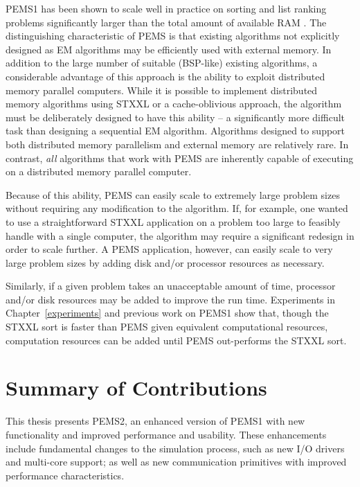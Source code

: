 \documentclass[12pt]{carletoncsthesis}
\begin{document}
PEMS1 has been shown to scale well in practice on sorting and list
ranking problems significantly larger than the total amount of available
RAM \cite{experimentswith}.  The distinguishing characteristic of PEMS is
that existing algorithms not explicitly designed as EM algorithms may be
efficiently used with external memory.  In addition to the large number of
suitable (BSP-like) existing algorithms, a considerable advantage of this
approach is the ability to exploit distributed memory parallel computers.
While it is possible to implement distributed memory algorithms using STXXL
or a cache-oblivious approach, the algorithm must be deliberately designed
to have this ability -- a significantly more difficult task than designing
a sequential EM algorithm.  Algorithms designed to support both distributed
memory parallelism and external memory are relatively rare.  In contrast,
{\em all} algorithms that work with PEMS are inherently capable of executing
on a distributed memory parallel computer.

Because of this ability, PEMS can easily scale to extremely large problem
sizes without requiring any modification to the algorithm.  If, for example,
one wanted to use a straightforward STXXL application on a problem too
large to feasibly handle with a single computer, the algorithm may require
a significant redesign in order to scale further.  A PEMS application,
however, can easily scale to very large problem sizes by adding disk and/or
processor resources as necessary.

Similarly, if a given problem takes an unacceptable amount of time, processor
and/or disk resources may be added to improve the run time.  Experiments in
Chapter~\ref{experiments} and previous work on PEMS1 \cite{mnthesis} show that,
though the STXXL sort is faster than PEMS given equivalent computational
resources, computation resources can be added until PEMS out-performs the
STXXL sort.

\section{Summary of Contributions}
\label{contributions}


This thesis presents PEMS2, an enhanced version of PEMS1 with new functionality
and improved performance and usability.  These enhancements include fundamental
changes to the simulation process, such as new I/O drivers and multi-core
support; as well as new communication primitives with improved performance
characteristics.
\end{document}
